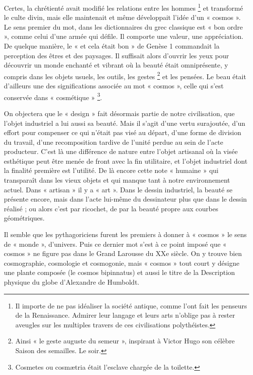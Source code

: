 \documentclass[a4paper,12pt]{article}
\begin{document}
Certes, la chrétienté avait modifié les relations entre les hommes \footnote{Il importe de ne pas idéaliser la société antique, comme l’ont fait les penseurs de la Renaissance. Admirer leur langage et leurs arts n’oblige pas à rester aveugles sur les multiples travers de ces civilisations polythéistes.} et transformé le culte divin, mais elle maintenait et même développait l'idée d'un « cosmos ». 
Le sens premier du mot, dans les dictionnaires du grec classique est « bon ordre », comme celui d'une armée qui défile. Il comporte une valeur, une appréciation. De quelque manière, le « et cela était bon » de Genèse 1 commandait la perception des êtres et des paysages. Il suffisait alors d'ouvrir les yeux pour découvrir un monde enchanté et vibrant où la beauté était omniprésente, y compris dans les objets usuels, les outils, les gestes \footnote{Ainsi « le geste auguste du semeur », inspirant à Victor Hugo son célèbre Saison des semailles. Le soir.} et les pensées. Le beau était d'ailleurs une des significations associée au mot « cosmos », celle qui s’est conservée dans « cosmétique » \footnote{Cosmetes ou cosmætria était l’esclave chargée de la toilette.}. 

On objectera que le « design » fait désormais partie de notre civilisation, que l'objet industriel a lui aussi sa beauté. Mais il s'agit d'une vertu surajoutée, d'un effort pour compenser ce qui n'était pas visé au départ, d’une forme de division du travail, d'une recomposition tardive de l'unité perdue au sein de l'acte producteur. C'est là une différence de nature entre l'objet artisanal où la visée esthétique peut être menée de front avec la fin utilitaire, et l’objet industriel dont la finalité première est l'utilité. De là encore cette note « humaine » qui transparaît dans les vieux objets et qui manque tant à notre environnement actuel. Dans « artisan » il y a « art ». Dans le dessin industriel, la beauté se présente encore, mais dans l’acte lui-même du dessinateur plus que dans le dessin réalisé ; ou alors c’est par ricochet, de par la beauté propre aux courbes géométriques.

Il semble que les pythagoriciens furent les premiers à donner à « cosmos » le sens de « monde », d'univers. Puis ce dernier mot s'est à ce point imposé que « cosmos » ne figure pas dans le Grand Larousse du XXe siècle. On y trouve bien cosmographie, cosmologie et cosmogonie, mais « cosmos » tout court y désigne une plante composée (le cosmos bipinnatus) et aussi le titre de la Description physique du globe d’Alexandre de Humboldt. 
\end{document}
